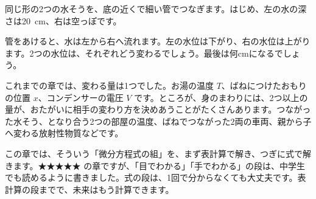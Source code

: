 \begin{hatena}
\noindent\begin{minipage}[c]{0.56\linewidth}
\raggedright
同じ形の2つの水そうを、底の近くで細い管でつなぎます。はじめ、左の水の深さは\qty{20}{cm}、右は空っぽです。

管をあけると、水は左から右へ流れます。左の水位は下がり、右の水位は上がります。2つの水位は、それぞれどう変わるでしょう。最後は何cmになるでしょう。
\end{minipage}\hfill
\begin{minipage}[c]{0.4\linewidth}
\centering
{}
\end{minipage}
\end{hatena}

\noindent これまでの章では、変わる量は1つでした。お湯の温度 $T$、ばねにつけたおもりの位置 $x$、コンデンサーの電圧 $V$ です。ところが、身のまわりには、2つ以上の量が、おたがいに相手の変わり方を決めあうことがたくさんあります。つながった水そう、となり合う2つの部屋の温度、ばねでつながった2両の車両、親から子へ変わる放射性物質などです。

この章では、そういう「微分方程式の組」を、まず表計算で解き、つぎに式で解きます。★★★★★ の章ですが、「目でわかる」「手でわかる」の段は、中学生でも読めるように書きました。式の段は、1回で分からなくても大丈夫です。表計算の段までで、未来はもう計算できます。

